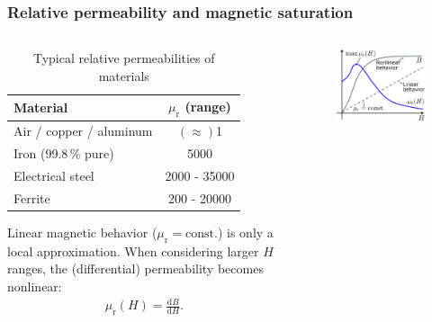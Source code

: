 \begin{frame}
	\frametitle{Relative permeability and magnetic saturation}
	\begin{columns}
		\begin{column}{0.575\textwidth}
			\begin{table}
            \centering
            \begin{tabular}{lc}
                \toprule
                Material & $\mu_{\mathrm{r}}$ (range)\\
                \midrule
                Air / copper / aluminum & $(\approx)$1 \\ 
                Iron (99.8\,\% pure) & 5000\\
                Electrical steel & 2000 - 35000\\
                Ferrite & 200 - 20000\\
                \bottomrule
            \end{tabular}
            \caption{Typical relative permeabilities of materials}
            \label{tab:rel_permeabilities}
            \end{table}
        Linear magnetic behavior ($\mu_{\mathrm{r}}=\mbox{const.}$) is only a local approximation. When considering larger $H$ ranges, the (differential) permeability becomes nonlinear:
        \begin{align}
            \mu_\mathrm{r}(H) =  \frac{\mathrm{d}B}{\mathrm{d}H}.
        \end{align}
		\end{column}
        \hfill
		\begin{column}{0.425\textwidth}
			\begin{figure}
				\centering
				\includegraphics[height=0.5\textheight]{fig/lec02/Permeability_of_ferromagnet.pdf}

\end{figure}
\end{column}
\end{columns}
\end{frame}
